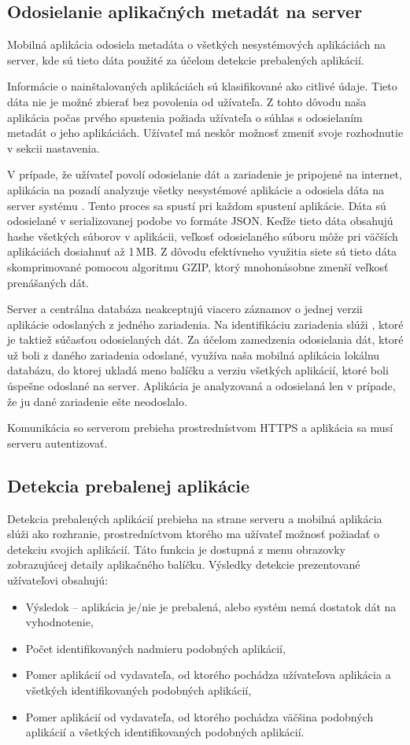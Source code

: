 \subsection{Odosielanie aplikačných metadát na server}
Mobilná aplikácia odosiela metadáta o všetkých nesystémových aplikáciách na server, kde sú tieto dáta použité za účelom detekcie prebalených aplikácií.

Informácie o nainštalovaných aplikáciách sú klasifikované ako citlivé údaje. Tieto dáta nie je možné zbierať bez povolenia od užívateľa. Z tohto dôvodu naša aplikácia počas prvého spustenia požiada užívateľa o súhlas s odosielaním metadát o jeho aplikáciách. Užívateľ má neskôr možnosť zmeniť svoje rozhodnutie v sekcii nastavenia.

V prípade, že užívateľ povolí odosielanie dát a zariadenie je pripojené na internet, aplikácia na pozadí analyzuje všetky nesystémové aplikácie a odosiela dáta na server systému . Tento proces sa spustí pri každom spustení aplikácie. Dáta sú odosielané v serializovanej podobe vo formáte JSON. Keďže tieto dáta obsahujú hashe všetkých súborov v aplikácii, veľkosť odosielaného súboru môže pri väčších aplikáciách dosiahnuť až 1\,MB. Z dôvodu efektívneho využitia siete sú tieto dáta skomprimované pomocou algoritmu GZIP, ktorý mnohonásobne zmenší veľkosť prenášaných dát.

Server a centrálna databáza neakceptujú viacero záznamov o jednej verzii aplikácie odoslaných z jedného zariadenia. Na identifikáciu zariadenia slúži , ktoré je taktiež súčasťou odosielaných dát. Za účelom zamedzenia odosielania dát, ktoré už boli z daného zariadenia odoslané, využíva naša mobilná aplikácia lokálnu databázu, do ktorej ukladá meno balíčku a verziu všetkých aplikácií, ktoré boli úspešne odoslané na server. Aplikácia je analyzovaná a odosielaná len v prípade, že ju dané zariadenie ešte neodoslalo.

Komunikácia so serverom prebieha prostrednístvom HTTPS a aplikácia sa musí serveru autentizovať.

\subsection{Detekcia prebalenej aplikácie}
Detekcia prebalených aplikácií prebieha na strane serveru a mobilná aplikácia slúži ako rozhranie, prostredníctvom ktorého ma užívateľ možnosť požiadať o detekciu svojich aplikácií. Táto funkcia je dostupná z menu obrazovky zobrazujúcej detaily aplikačného balíčku. Výsledky detekcie prezentované užívateľovi obsahujú:
\begin{itemize}
	\item Výsledok -- aplikácia je/nie je prebalená, alebo systém nemá dostatok dát na vyhodnotenie,
	\item Počet identifikovaných nadmieru podobných aplikácií,
	\item Pomer aplikácií od vydavateľa, od ktorého pochádza užívateľova aplikácia a všetkých identifikovaných podobných aplikácií,
	\item Pomer aplikácií od vydavateľa, od ktorého pochádza väčšina podobných aplikácií a všetkých identifikovaných podobných aplikácií.
\end{itemize}
	
	

